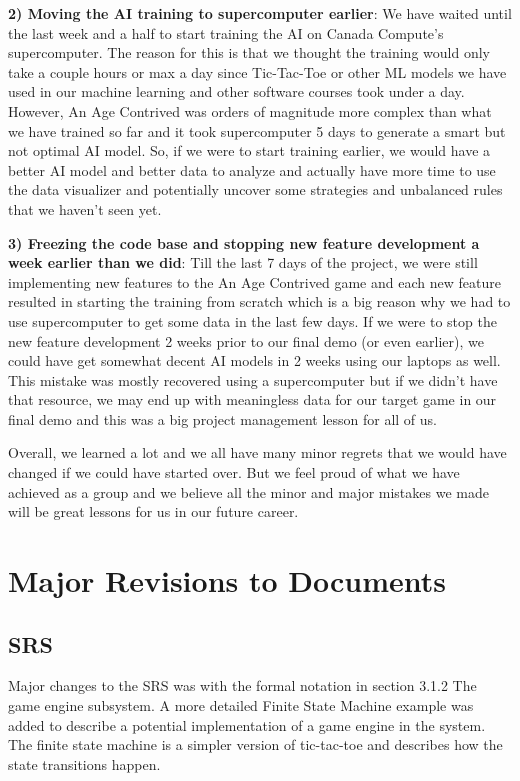 \documentclass{article}
\begin{document}
\textbf{2) Moving the AI training to supercomputer earlier}: We have waited until the last week and a half to start training the AI on Canada Compute's supercomputer. The reason for this is that we thought the training would only take a couple hours or max a day since Tic-Tac-Toe or other ML models we have used in our machine learning and other software courses took under a day. However, An Age Contrived was orders of magnitude more complex than what we have trained so far and it took supercomputer 5 days to generate a smart but not optimal AI model. So, if we were to start training earlier, we would have a better AI model and better data to analyze and actually have more time to use the data visualizer and potentially uncover some strategies and unbalanced rules that we haven't seen yet.

\textbf{3) Freezing the code base and stopping new feature development a week earlier than we did}: Till the last 7 days of the project, we were still implementing new features to the An Age Contrived game and each new feature resulted in starting the training from scratch which is a big reason why we had to use supercomputer to get some data in the last few days. If we were to stop the new feature development 2 weeks prior to our final demo (or even earlier), we could have get somewhat decent AI models in 2 weeks using our laptops as well. This mistake was mostly recovered using a supercomputer but if we didn't have that resource, we may end up with meaningless data for our target game in our final demo and this was a big project management lesson for all of us.

Overall, we learned a lot and we all have many minor regrets that we would have changed if we could have started over. But we feel proud of what we have achieved as a group and we believe all the minor and major mistakes we made will be great lessons for us in  our future career.

\section{Major Revisions to Documents}
\subsection{SRS}
Major changes to the SRS was with the formal notation in section 3.1.2 The game engine subsystem. A more detailed Finite State Machine example was added to describe a potential implementation of a game engine in the system. The finite state machine is a simpler version of tic-tac-toe and describes how the state transitions happen.
\end{document}

